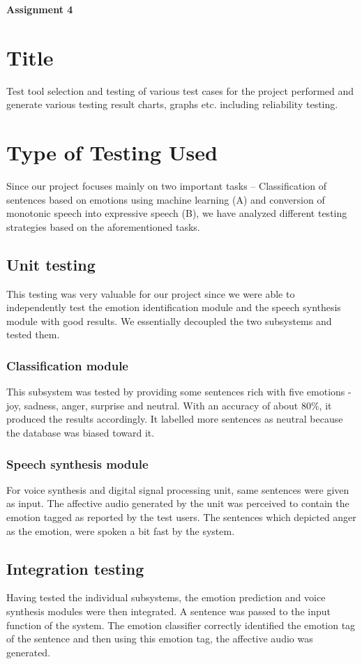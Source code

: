 \documentclass[oneside,a4paper,12pt]{book}
\begin{document}
\begin{appendices}
\newpage
\begin{center}
	\textbf{Assignment 4}
\end{center}
\section{Title}
Test tool selection and testing of various test cases for the project performed and generate various testing result charts, graphs etc. including reliability testing.
\section{Type of Testing Used}
Since our project focuses mainly on two important tasks – Classification of sentences based on emotions using machine learning (A) and conversion of monotonic speech into expressive speech (B), we have analyzed different testing strategies based on the aforementioned tasks.
\subsection{Unit testing}
This testing was very valuable for our project since we were able to independently test the emotion identification module and the speech synthesis module with good results. We essentially decoupled the two subsystems and tested them.
\subsubsection{Classification module}
This subsystem was tested by providing some sentences rich with five emotions - joy, sadness, anger,  surprise and neutral. With an accuracy of about 80\%, it produced the results accordingly. It labelled more sentences as neutral because the database was biased toward it.

\subsubsection{Speech synthesis module} 
For voice synthesis and digital signal processing unit, same sentences were given as input. The affective audio generated by the unit was perceived to contain the emotion tagged as reported by the test users. The sentences which depicted anger as the emotion, were spoken a bit fast by the system.

\subsection{Integration testing}
Having tested the individual subsystems, the emotion prediction and voice synthesis modules were then integrated. A sentence was passed to the input function of the system. The emotion classifier correctly identified the emotion tag of the sentence and then using this emotion tag, the affective audio was generated.

\end{appendices}
\end{document}
